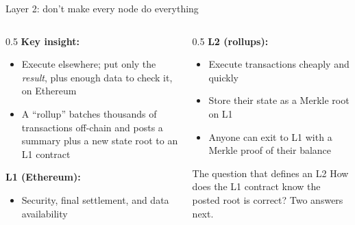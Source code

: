 \ifdefined\PRESENTATION\else\PassOptionsToClass{handout}{beamer}\fi\documentclass[aspectratio=169, lualatex]{beamer}
\begin{document}
\begin{frame}{Layer 2: don't make every node do everything}
	\begin{columns}[c]
		\begin{column}{0.5\textwidth}
			\textbf{Key insight:}
			\begin{itemize}
				\item Execute elsewhere; put only the \emph{result}, plus enough data to check it, on Ethereum
				\item A ``rollup'' batches thousands of transactions off-chain and posts a summary plus a new state root to an L1 contract
			\end{itemize}
			\textbf{L1 (Ethereum):}
			\begin{itemize}
				\item Security, final settlement, and data availability
			\end{itemize}
		\end{column}
		\begin{column}{0.5\textwidth}
			\textbf{L2 (rollups):}
			\begin{itemize}
				\item Execute transactions cheaply and quickly
				\item Store their state as a Merkle root on L1
				\item Anyone can exit to L1 with a Merkle proof of their balance
			\end{itemize}
			\begin{exampleblock}{The question that defines an L2}
				How does the L1 contract know the posted root is correct? Two answers next.
			\end{exampleblock}
		\end{column}
	\end{columns}
\end{frame}
\end{document}
